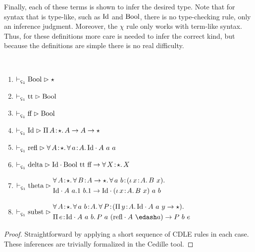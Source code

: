 Finally, each of these terms is shown to infer the desired type.
Note that for syntax that is type-like, such as $\textnormal{Id}$ and $\textnormal{Bool}$, there is no type-checking rule, only an inference judgment.
Moreover, the $\chi$ rule only works with term-like syntax.
Thus, for these definitions more care is needed to infer the correct kind, but because the definitions are simple there is no real difficulty.
\begin{lemma}
    \label{lem:4:c1_stuff}
    \textcolor{white}{\_}
    \begin{enumerate}
        \item $\vdash_{\oldced} \cBool \infr \star$
        \item $\vdash_{\oldced} \ctt \infr \cBool$
        \item $\vdash_{\oldced} \cff \infr \cBool$
        \item $\vdash_{\oldced} \cId \infr \abs{\Pi}{A}{\star}{A \to A \to \star}$
        \item {
            $
                \vdash_{\oldced} \crefl \infr \abs{\forall}{A}{\star}{
                    \abs{\forall}{a}{A}{
                        \cId \cdot A\ a\ a
                    }
                }
            $
        }
        \item $\vdash_{\oldced} \cdelta \infr \cId \cdot \cBool\ \ctt\ \cff \to \abs{\forall}{X}{\star}{X}$
        \item {
            $\vdash_{\oldced} \ctheta \infr
            \begin{aligned}
                 &\abs{\forall}{A}{\star}{
                    \abs{\forall}{B}{A \to \star}{
                        \abs{\forall}{a\ b}{(\abs{\iota}{x}{A}{B\ x})}{
                            \\ &\cId \cdot A\ a.1\ b.1 \to \cId \cdot (\abs{\iota}{x}{A}{B\ x})\ a\ b
                        }
                    }
                }
            \end{aligned}
            $
        }
        \item {
            $\vdash_{\oldced} \csubst \infr 
            \begin{aligned}
                &\abs{\forall}{A}{\star}{
                    \abs{\forall}{a\ b}{A}{
                        \abs{\forall}{P}{ (\abs{\Pi}{y}{A}{\cId \cdot A\ a\ y \to \star}) }{
                            \\ &\abs{\Pi}{e}{\cId \cdot A\ a\ b}{
                                P\ a\ (\crefl \cdot A\ \edash a) \to P\ b\ e
                            }
                        }
                    }
                }
            \end{aligned}
            $
        }
    \end{enumerate}
\end{lemma}
\begin{proof}
    Straightforward by applying a short sequence of CDLE rules in each case.
    These inferences are trivially formalized in the Cedille tool.
\end{proof}

